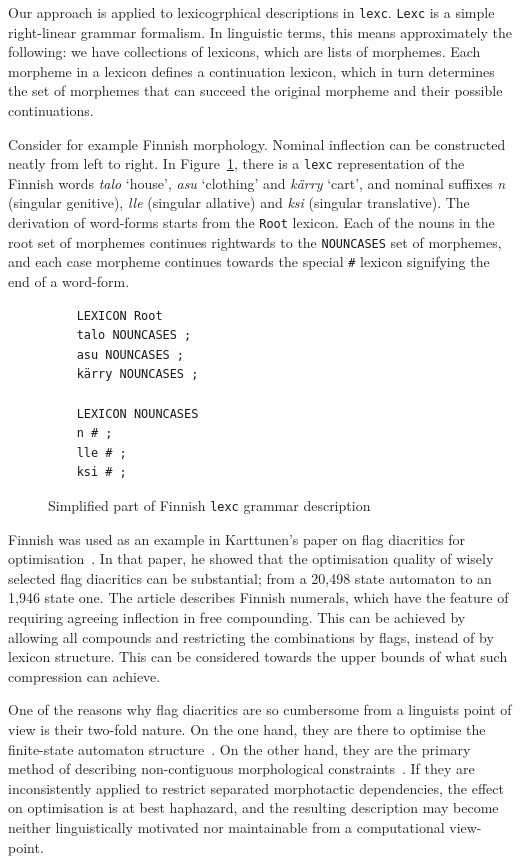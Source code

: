 \documentclass[11pt]{article}
\begin{document}
Our approach is applied to lexicogrphical descriptions in \texttt{lexc}. \texttt{Lexc}
is a simple right-linear grammar formalism. In
linguistic terms, this means approximately the following: we have
collections of lexicons, which are lists of morphemes. Each morpheme
in a lexicon defines a continuation lexicon, which in turn determines
the set of morphemes that can succeed the original morpheme and their
possible continuations.

Consider for example Finnish morphology. Nominal inflection can be
constructed neatly from left to right. In Figure~\ref{fig:lexc-fin},
there is a \texttt{lexc} representation of the Finnish words \emph{talo} `house',
\emph{asu} `clothing' and \emph{kärry} `cart', and nominal suffixes
\emph{n} (singular genitive), \emph{lle} (singular allative) and
\emph{ksi} (singular translative). The derivation of word-forms starts
from the \texttt{Root} lexicon. Each of the nouns in the root set of morphemes
continues rightwards to the \texttt{NOUNCASES} set of morphemes, and each
case morpheme continues towards the special \texttt{\#} lexicon
signifying the end of a word-form.

\begin{figure}[!h]
    \centering
    \begin{verbatim}
    LEXICON Root
    talo NOUNCASES ;
    asu NOUNCASES ;
    kärry NOUNCASES ;

    LEXICON NOUNCASES
    n # ;
    lle # ;
    ksi # ;
    \end{verbatim}
    \caption{Simplified part of Finnish \texttt{lexc} grammar description
    \label{fig:lexc-fin}}
\end{figure}

Finnish was used as an example in Karttunen's paper on flag diacritics
for optimisation~. In that paper, he
showed that the optimisation quality of wisely selected flag
diacritics can be substantial; from a 20,498 state automaton to an
1,946 state one. The article describes Finnish numerals, which have
the feature of requiring agreeing inflection in free compounding. This
can be achieved by allowing all compounds and restricting the
combinations by flags, instead of by lexicon structure. This can be
considered towards the upper bounds of what such compression can
achieve.

One of the reasons why flag diacritics are so cumbersome from
a linguists point of view is their two-fold nature. On the one hand,
they are there to optimise the finite-state automaton structure~\cite{karttunen2006numbers}. On the other hand, they are the
primary method of describing non-contiguous morphological
constraints~\cite{beesley1998constraining}. If they are inconsistently applied to restrict
separated morphotactic dependencies, the effect on
optimisation is at best haphazard, and the resulting description may become
neither linguistically motivated nor maintainable from a computational
view-point.
\end{document}
